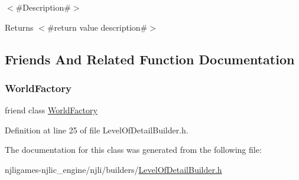 $<$\#\+Description\#$>$

\begin{DoxyReturn}{Returns}
$<$\#return value description\#$>$ 
\end{DoxyReturn}


\subsection{Friends And Related Function Documentation}
\mbox{\label{classnjli_1_1_level_of_detail_builder_acb96ebb09abe8f2a37a915a842babfac}} 
\subsubsection{\texorpdfstring{World\+Factory}{WorldFactory}}
{\footnotesize\ttfamily friend class \mbox{\hyperlink{classnjli_1_1_world_factory}{World\+Factory}}\hspace{0.3cm}{\ttfamily [friend]}}



Definition at line 25 of file Level\+Of\+Detail\+Builder.\+h.



The documentation for this class was generated from the following file\+:\begin{DoxyCompactItemize}
\item 
njligames-\/njlic\+\_\+engine/njli/builders/\mbox{\hyperlink{_level_of_detail_builder_8h}{Level\+Of\+Detail\+Builder.\+h}}\end{DoxyCompactItemize}
